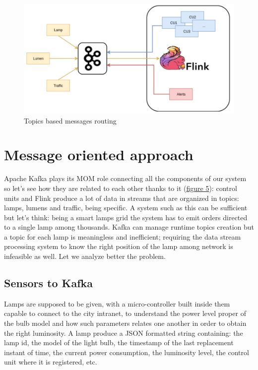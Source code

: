 \begin{figure}[!b]
\begin{center}
	\includegraphics[scale=0.50]{img/ember_kafkatopology}
	\caption{Topics based messages routing}
	\label{fig:ember_kafkatopology}
\end{center}
\end{figure}

\section{Message oriented approach}
Apache Kafka plays its MOM role connecting all the components of our system so let’s see how they are related to each other thanks to it (\hyperref[fig:ember_kafkatopology]{figure 5}): control units and Flink produce a lot of data in streams that are organized in topics: lamps, lumens and traffic, being specific. A system such as this can be sufficient but let’s think: being a smart lamps grid the system has to emit orders directed to a single lamp among thousands. Kafka can manage runtime topics creation but a topic for each lamp is meaningless and inefficient; requiring the data stream processing system to know the right position of the lamp among network is infeasible as well. Let we analyze better the problem.

\subsection{Sensors to Kafka}
Lamps are supposed to be given, with a micro-controller built inside them capable to connect to the city intranet, to understand the power level proper of the bulb model and how such parameters relates one another in order to obtain the right luminosity. A lamp produce a JSON formatted string containing: the lamp id, the model of the light bulb, the timestamp of the last replacement instant of time, the current power consumption, the luminosity level, the control unit where it is registered, etc.

